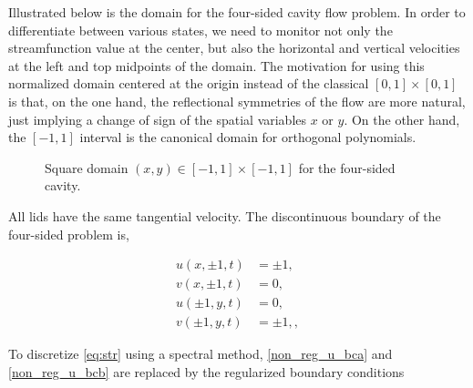 Illustrated below is the domain for the four-sided cavity flow problem. In
order to differentiate between various states, we need to monitor not only the
streamfunction value at the center, but also the horizontal and vertical
velocities at the left and top midpoints of the domain. The motivation for
using this normalized domain centered at the origin instead of the classical
$[0,1]\times[0,1]$ is that, on the one hand, the reflectional symmetries of the
flow are more natural, just implying a change of sign of the spatial variables
$x$ or $y$. On the other hand, the $[-1,1]$ interval is the canonical domain
for orthogonal polynomials. 

\begin{figure}[ht]
\centering
{}
\caption{Square domain $(x,y) \in [-1,1]\times[-1,1]$ for the four-sided cavity.}
\label{fig:cav_domain}
\end{figure}

All lids have the same tangential velocity. The discontinuous boundary of the
four-sided problem is,

\begin{eqnarray}
u(x,\pm 1,t) & = \pm 1,\label{non_reg_u_bca} \\
v(x,\pm 1,t) & = 0, \\
u(\pm 1,y,t) & = 0, \\
v(\pm 1,y,t) & = \pm 1,,\label{non_reg_u_bcb}
\label{non_reg_u_bc}
\end{eqnarray}

To discretize \eqref{eq:str} using a spectral method, \eqref{non_reg_u_bca} and
\eqref{non_reg_u_bcb} are replaced by the regularized boundary conditions

